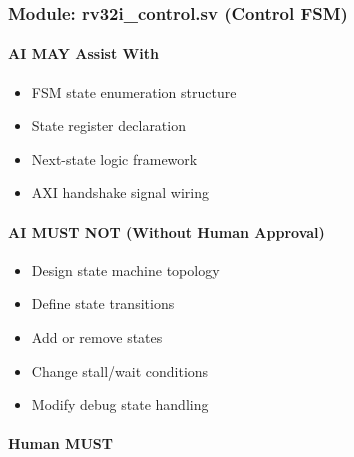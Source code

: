 \subsubsection{\texorpdfstring{Module: rv32i\_\allowbreak{}control.sv
(Control FSM)}{Module: rv32i\_control.sv (Control FSM)}}\label{cr:status:phase1-ai-human-responsibilities:module-rv32i-controlsv-control-fsm}

\paragraph{\texorpdfstring{\ok{} AI MAY Assist
With}{ AI MAY Assist With}}\label{cr:status:phase1-ai-human-responsibilities:white-check-mark-ai-may-assist-with-4}

\begin{record}

\begin{itemize}
\tightlist
\item
  FSM state enumeration structure
\item
  State register declaration
\item
  Next-state logic framework
\item
  AXI handshake signal wiring
\end{itemize}

\end{record}

\paragraph{\texorpdfstring{\warn{} AI MUST NOT (Without Human
Approval)}{ AI MUST NOT (Without Human Approval)}}\label{cr:status:phase1-ai-human-responsibilities:warning-ai-must-not-without-human-approval-4}

\begin{record}

\begin{itemize}
\tightlist
\item
  Design state machine topology
\item
  Define state transitions
\item
  Add or remove states
\item
  Change stall/\allowbreak{}wait conditions
\item
  Modify debug state handling
\end{itemize}

\end{record}

\paragraph{\texorpdfstring{\hold{} Human MUST}{ Human MUST}}\label{cr:status:phase1-ai-human-responsibilities:raised-hand-human-must-4}


